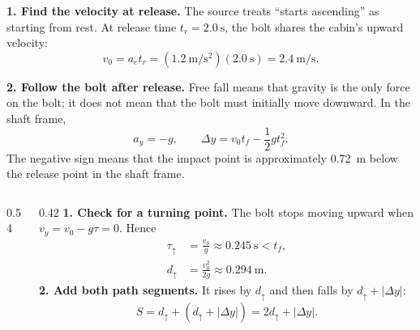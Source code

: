 \begin{solutionframe}
  \footnotesize
  \setlength{\abovedisplayskip}{3pt}
  \setlength{\belowdisplayskip}{3pt}
  \textbf{1. Find the velocity at release.} The source treats ``starts
  ascending'' as starting from rest. At release time
  $t_r=\SI{2.0}{\second}$, the bolt shares the cabin's upward velocity:
  \[
    v_0=a_et_r
      =(\SI{1.2}{\metre\per\second\squared})(\SI{2.0}{\second})
      =\SI{2.4}{\metre\per\second}.
  \]

  \textbf{2. Follow the bolt after release.} Free fall means that gravity is
  the only force on the bolt; it does not mean that the bolt must initially
  move downward. In the shaft frame,
  \[
    a_y=-g,
    \qquad
    \Delta y=v_0t_f-\frac12gt_f^2.
  \]
  The negative sign means that the impact point is approximately
  \SI{0.72}{\metre} below the release point in the shaft frame.
\end{solutionframe}

\begin{solutionframe}
  \begin{columns}[T,onlytextwidth]
    \begin{column}{0.54\textwidth}
      \centering
      \resizebox{0.94\textwidth}{!}{}
    \end{column}
    \begin{column}{0.42\textwidth}
      \footnotesize
      \setlength{\abovedisplayskip}{3pt}
      \setlength{\belowdisplayskip}{3pt}
      \setlength{\jot}{1pt}
      \textbf{1. Check for a turning point.} The bolt stops moving upward when
      $v_y=v_0-g\tau=0$. Hence
      \[
        \begin{aligned}
          \tau_{\uparrow}&=\frac{v_0}{g}
            \approx\SI{0.245}{\second}<t_f,\\
          d_{\uparrow}&=\frac{v_0^2}{2g}
            \approx\SI{0.294}{\metre}.
        \end{aligned}
      \]
      \textbf{2. Add both path segments.} It rises by $d_{\uparrow}$ and then
      falls by $d_{\uparrow}+|\Delta y|$:
      \[
        S=d_{\uparrow}+(d_{\uparrow}+|\Delta y|)
          =2d_{\uparrow}+|\Delta y|.
      \]
    \end{column}
  \end{columns}
\end{solutionframe}

